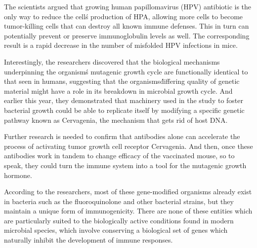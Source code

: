 \documentclass{article}
\begin{document}
The scientists argued that growing human papillomavirus (HPV) antibiotic is the only way to reduce the cell\'s production of HPA, allowing more cells to become tumor-killing cells that can destroy all known immune defenses. This in turn can potentially prevent or preserve immunoglobulin levels as well. The corresponding result is a rapid decrease in the number of misfolded HPV infections in mice.

Interestingly, the researchers discovered that the biological mechanisms underpinning the organism\'s mutagenic growth cycle are functionally identical to that seen in humans, suggesting that the organisms\' differing quality of genetic material might have a role in its breakdown in microbial growth cycle. And earlier this year, they demonstrated that machinery used in the study to foster bacterial growth could be able to replicate itself by modifying a specific genetic pathway known as Cervagenia, the mechanism that gets rid of host DNA.

Further research is needed to confirm that antibodies alone can accelerate the process of activating tumor growth cell receptor Cervagenia. And then, once these antibodies work in tandem to change efficacy of the vaccinated mouse, so to speak, they could turn the immune system into a tool for the mutagenic growth hormone.

According to the researchers, most of these gene-modified organisms already exist in bacteria such as the fluoroquinolone and other bacterial strains, but they maintain a unique form of immunogenicity. There are none of these entities which are particularly suited to the biologically active conditions found in modern microbial species, which involve conserving a biological set of genes which naturally inhibit the development of immune responses.
\end{document}
